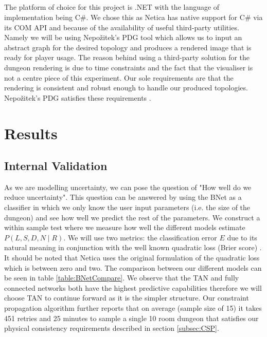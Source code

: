 \documentclass{UoYCSproject}
\begin{document}
\paragraph{}
The platform of choice for this project is .NET with the language of implementation being C\#. We chose this as Netica has native support for C\# via its COM API and because of the availability of useful third-party utilities. Namely we will be using Nepo\v{z}itek's PDG tool \parencite{levelGenerator} which allows us to input an abstract graph for the desired topology and produces a rendered image that is ready for player usage. The reason behind using a third-party solution for the dungeon rendering is due to time constraints and the fact that the visualiser is not a centre piece of this experiment. Our sole requirements are that the rendering is consistent and robust enough to handle our produced topologies. Nepo\v{z}itek's PDG satisfies these requirements \parencite{Nepozitek2018FASTCT}.

\chapter{Results}
\label{cha:results}
\section{Internal Validation}
As we are modelling uncertainty, we can pose the question of "How well do we reduce uncertainty". This question can be answered by using the BNet as a classifier in which we only know the user input parameters (i.e. the size of the dungeon) and see how well we predict the rest of the parameters. We construct a within sample test where we measure how well the different models estimate \(P(L,S,D,N\mid R)\). We will use two metrics: the classification error \(E\) due to its natural meaning in conjunction with the well known quadratic loss (Brier score) \parencite{PearlScoringRules}. It should be noted that Netica uses the original formulation of the quadratic loss which is between zero and two. The comparison between our different models can be seen in table \ref{table:BNetCompare}. We observe that the TAN and fully connected networks both have the highest predictive capabilities therefore we will choose TAN to continue forward as it is the simpler structure. Our constraint propagation algorithm further reports that on average (sample size of 15) it takes 451 retries and 25 minutes to sample a single 10 room dungeon that satisfies our physical consistency requirements described in section \ref{subsec:CSP}.
\end{document}

